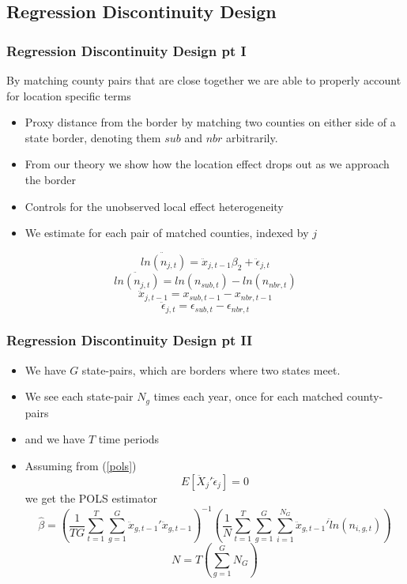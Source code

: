 \documentclass{beamer}
\begin{document}
\begin{frame}
\subsection{Regression Discontinuity Design}
\frametitle{Regression Discontinuity Design pt I}
By matching county pairs that are close together we are able to properly account for location specific terms
\begin{itemize}
\item  Proxy distance from the border by matching two counties on either side of a state border, denoting them $sub$ and $nbr$ arbitrarily.
\item From our theory we show how the location effect drops out as we approach the border
\item Controls for the unobserved local effect heterogeneity
\item We estimate for each pair of matched counties, indexed by $j$
\end{itemize}

\begin{equation} \label{pols}
\ddot{ln(n_{j,t})} = \ddot x_{j,t-1}\beta_{2} + \ddot \epsilon_{j,t}
\end{equation}
 $$\ddot{ln(n_{j,t})} = ln(n_{sub,t})-ln(n_{nbr,t})$$
 $$\ddot x_{j,t-1} = x_{sub,t-1}-x_{nbr,t-1}$$
 $$\ddot \epsilon_{j,t} = \epsilon_{sub,t}-\epsilon_{nbr,t}$$
\end{frame}

\begin{frame}
\frametitle{Regression Discontinuity Design pt II}
\begin{itemize}
\item We have $G$ state-pairs, which are borders where two states meet.
\item We see each state-pair $N_{g}$ times each year, once for each matched county-pairs
\item and we have $T$ time periods
\item Assuming from (\ref{pols}) 
\begin{equation}\label{moment}
E[\ddot X_{j}'\ddot \epsilon_{j}] = 0
\end{equation}
we get the POLS estimator
\begin{equation}\label{polsest}
\hat \beta = \left(\frac{1}{TG}\sum_{t=1}^{T}\sum_{g=1}^{G}\ddot x_{g,t-1}'\ddot x_{g,t-1}\right)^{-1}\left(\frac{1}{N}\sum_{t=1}^{T}\sum_{g=1}^{G}\sum_{i=1}^{N_{G}}\ddot x_{g,t-1}'\ddot ln(n_{i,g,t})\right)
\end{equation}
\begin{equation}\label{norm}
N = T(\sum_{g=1}^{G}N_{G})
\end{equation}
\end{itemize}
\end{frame}
\end{document}
